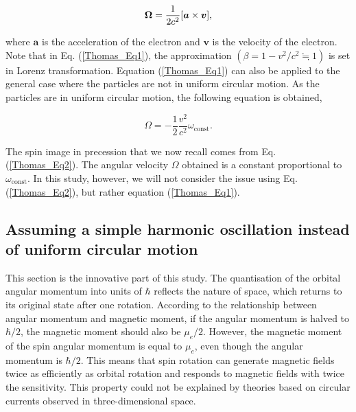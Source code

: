 \documentclass[%
 reprint,
 amsmath,amssymb,
 aps,
]{revtex4-1}
\numberwithin{equation}{section}%
\begin{document}
\begin{equation}
    {\bf \Omega}=\frac{1}{2 c^2}[{\boldsymbol a} \times {\boldsymbol v}],
    \label{Thomas_Eq1}
\end{equation}

\noindent where ${\boldsymbol a}$ is the acceleration of the electron and ${\boldsymbol v}$ is the velocity of the electron. Note that in Eq. (\ref{Thomas_Eq1}), the approximation $(\beta = 1 - v^2/c^2 \fallingdotseq 1)$ is set in Lorenz transformation. Equation (\ref{Thomas_Eq1}) can also be applied to the general case where the particles are not in uniform circular motion. As the particles are in uniform circular motion, the following equation is obtained,


\begin{equation}
    {\Omega}= - \frac{1}{2} \frac{v^2}{c^2} \omega_{\mathrm{const}}.
    \label{Thomas_Eq2}
\end{equation}

The spin image in precession that we now recall comes from Eq. (\ref{Thomas_Eq2}). The angular velocity $\Omega$ obtained is a constant proportional to $\omega_{\mathrm{const}}$. In this study, however, we will not consider the issue using Eq. (\ref{Thomas_Eq2}), but rather equation (\ref{Thomas_Eq1}).


\subsection{Assuming a simple harmonic oscillation instead of uniform circular motion}


This section is the innovative part of this study. The quantisation of the orbital angular momentum into units of $\hbar$ reflects the nature of space, which returns to its original state after one rotation. According to the relationship between angular momentum and magnetic moment, if the angular momentum is halved to $\hbar/2$, the magnetic moment should also be $\mu_e/2$. However, the magnetic moment of the spin angular momentum is equal to $\mu_e$, even though the angular momentum is $\hbar/2$. This means that spin rotation can generate magnetic fields twice as efficiently as orbital rotation and responds to magnetic fields with twice the sensitivity. This property could not be explained by theories based on circular currents observed in three-dimensional space.
\end{document}
